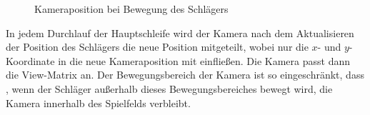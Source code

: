 \begin{figure}[t]
	\centering
	\vspace{1.5cm}%
	\vspace{-1.5cm}
	\caption[Weitere Testbilder]{Kameraposition bei Bewegung des Schlägers}
	\label{fig:camera}
\end{figure}

In jedem Durchlauf der Hauptschleife wird der Kamera nach dem Aktualisieren der Position des Schlägers die neue Position mitgeteilt, wobei nur die $x$- und $y$-Koordinate in die neue Kameraposition mit einfließen. Die Kamera passt dann die View-Matrix an. Der Bewegungsbereich der Kamera ist so eingeschränkt, dass , wenn der Schläger außerhalb dieses Bewegungsbereiches bewegt wird, die Kamera innerhalb des Spielfelds verbleibt.
